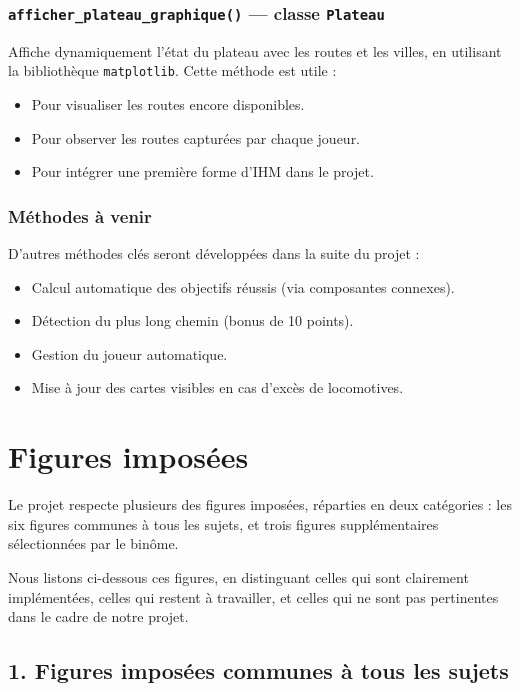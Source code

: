 \documentclass[a4paper,12pt]{report}
\begin{document}
\subsection*{\texttt{afficher\_plateau\_graphique()} — classe \texttt{Plateau}}

Affiche dynamiquement l’état du plateau avec les routes et les villes, en utilisant la bibliothèque \texttt{matplotlib}.
Cette méthode est utile :
\begin{itemize}
    \item Pour visualiser les routes encore disponibles.
    \item Pour observer les routes capturées par chaque joueur.
    \item Pour intégrer une première forme d'IHM dans le projet.
\end{itemize}

\subsection*{Méthodes à venir}

D'autres méthodes clés seront développées dans la suite du projet :
\begin{itemize}
    \item Calcul automatique des objectifs réussis (via composantes connexes).
    \item Détection du plus long chemin (bonus de 10 points).
    \item Gestion du joueur automatique.
    \item Mise à jour des cartes visibles en cas d'excès de locomotives.
\end{itemize}





\chapter{Figures imposées}

Le projet respecte plusieurs des figures imposées, réparties en deux catégories :
les six figures communes à tous les sujets, et trois figures supplémentaires sélectionnées par le binôme.

Nous listons ci-dessous ces figures, en distinguant celles qui sont clairement implémentées,
celles qui restent à travailler, et celles qui ne sont pas pertinentes dans le cadre de notre projet.

\section*{1. Figures imposées communes à tous les sujets}
\end{document}
